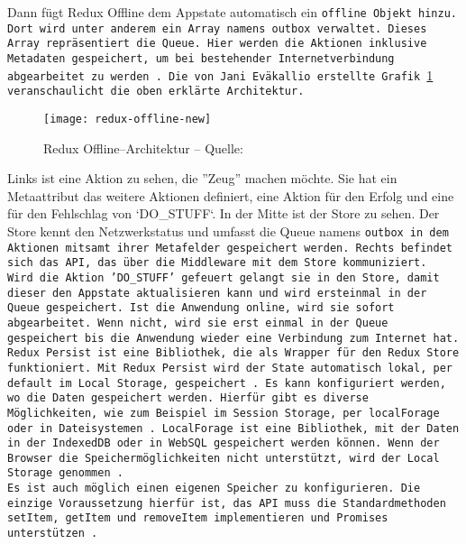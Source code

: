 Dann fügt Redux Offline dem \gls{App}state automatisch ein \tt{offline} Objekt hinzu. Dort wird unter anderem ein Array namens \tt{outbox} verwaltet.
Dieses Array repräsentiert die \gls{Queue}. Hier werden die Aktionen inklusive Metadaten gespeichert, um bei bestehender Internetverbindung abgearbeitet zu werden~\cite{redux-offline-docs}.
Die von Jani Eväkallio erstellte Grafik \ref{fig:redux-offline} veranschaulicht die oben erklärte Architektur.
%
\begin{figure}[h]
  \centering
  \texttt{[image: redux-offline-new]}
  \grayRule
  \caption[Redux Offline]{Redux Offline--Architektur -- Quelle:~\cite{redux-offline}}
  \label{fig:redux-offline}
\end{figure}
%
Links ist eine Aktion zu sehen, die ''Zeug'' machen möchte. Sie hat ein Metaattribut das weitere Aktionen definiert, eine Aktion für den Erfolg und eine für den Fehlschlag von `DO\_STUFF`.
In der Mitte ist der Store zu sehen.
Der Store kennt den Netzwerkstatus und umfasst die \gls{Queue} namens \tt{outbox} in dem Aktionen mitsamt ihrer Metafelder gespeichert werden.
Rechts befindet sich das \gls{API}, das über die \gls{Middleware} mit dem Store kommuniziert.\\
Wird die Aktion 'DO\_STUFF' gefeuert gelangt sie in den Store, damit dieser den \gls{App}state aktualisieren kann und wird ersteinmal in der \gls{Queue} gespeichert.
Ist die Anwendung online, wird sie sofort abgearbeitet.
Wenn nicht, wird sie erst einmal in der \gls{Queue} gespeichert bis die Anwendung wieder eine Verbindung zum Internet hat.
%
%
Redux Persist ist eine Bibliothek, die als Wrapper für den Redux Store funktioniert.
Mit Redux Persist wird der State automatisch lokal, per default im Local Storage, gespeichert~\cite{redux-persist}.
Es kann konfiguriert werden, wo die Daten gespeichert werden.
Hierfür gibt es diverse Möglichkeiten, wie zum Beispiel im Session Storage, per localForage oder in Dateisystemen~\cite{redux-persist-gh}.
LocalForage ist eine Bibliothek, mit der Daten in der IndexedDB oder in WebSQL gespeichert werden können.
Wenn der Browser die Speichermöglichkeiten nicht unterstützt, wird der Local Storage genommen~\cite{localforage}.\\
Es ist auch möglich einen eigenen Speicher zu konfigurieren.
Die einzige Voraussetzung hierfür ist, das \gls{API} muss die Standardmethoden \tt{setItem}, \tt{getItem} und \tt{removeItem} implementieren und Promises unterstützen~\cite{redux-persist-gh}.
%
%
